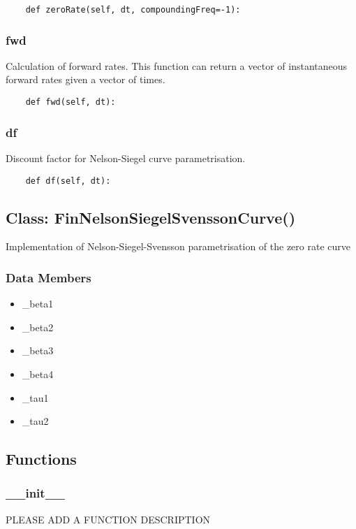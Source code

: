 \documentclass[twoside,11pt]{book}
\begin{document}
\begin{lstlisting}
    def zeroRate(self, dt, compoundingFreq=-1):
\end{lstlisting}

\subsubsection*{{\bf fwd}}
Calculation of forward rates. This function can return a vector of instantaneous forward rates given a vector of times.  

\begin{lstlisting}
    def fwd(self, dt):
\end{lstlisting}

\subsubsection*{{\bf df}}
Discount factor for Nelson-Siegel curve parametrisation.  

\begin{lstlisting}
    def df(self, dt):
\end{lstlisting}

\subsection*{Class: FinNelsonSiegelSvenssonCurve()}
Implementation of Nelson-Siegel-Svensson parametrisation of the zero rate curve  

\subsubsection*{Data Members}
\begin{itemize}
\item{\_beta1}
\item{\_beta2}
\item{\_beta3}
\item{\_beta4}
\item{\_tau1}
\item{\_tau2}
\end{itemize}

\subsection*{Functions}

\subsubsection*{{\bf \_\_init\_\_}}
PLEASE ADD A FUNCTION DESCRIPTION
\end{document}
